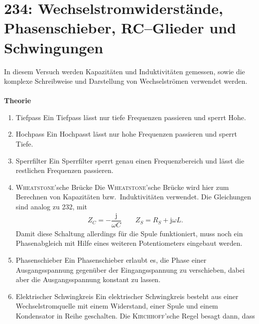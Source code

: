 \section{234: Wechselstromwiderstände, Phasenschieber, RC--Glieder und Schwingungen}
In diesem Versuch werden Kapazitäten und Induktivitäten gemessen, sowie die komplexe Schreibweise und Darstellung von Wechselströmen verwendet werden.\\\\
\textbf{Theorie} 
\begin{enumerate}[label=--]
        \item Tiefpass \hspace{25pt} 
                Ein Tiefpass lässt nur tiefe Frequenzen passieren und sperrt Hohe.
        \item Hochpass \hspace{25pt} 
                Ein Hochpasst lässt nur hohe Frequenzen passieren und sperrt Tiefe.
        \item Sperrfilter \hspace{25pt} 
                Ein Sperrfilter sperrt genau einen Frequenzbereich und lässt die restlichen Frequenzen passieren.
        \item \textsc{Wheatstone}'sche Brücke \hspace{25pt} 
                Die \textsc{Wheatstone}'sche Brücke wird hier zum Berechnen von Kapazitäten bzw.\ Induktivitäten verwendet. Die Gleichungen sind analog zu 232, mit
                \begin{align} 
                        Z_C=-\dfrac{\text{j}}{\omega C}\qquad Z_S=R_S+\text{j}\omega L
                .\end{align} 
                Damit diese Schaltung allerdings für die Spule funktioniert, muss noch ein Phasenabgleich mit Hilfe eines weiteren Potentiometers eingebaut werden.
        \item Phasenschieber \hspace{25pt}
                Ein Phasenschieber erlaubt es, die Phase einer Ausgangsspannung gegenüber der Eingangsspannung zu verschieben, dabei aber die Ausgangsspannung konstant zu lassen.
        \item Elektrischer Schwingkreis \hspace{25pt} 
                Ein elektrischer Schwingkreis besteht aus einer Wechselstromquelle mit einem Widerstand, einer Spule und einem Kondensator in Reihe geschalten.
                Die \textsc{Kirchhoff}'sche Regel besagt dann, dass
                \begin{align} 

\end{align}
\end{enumerate}
